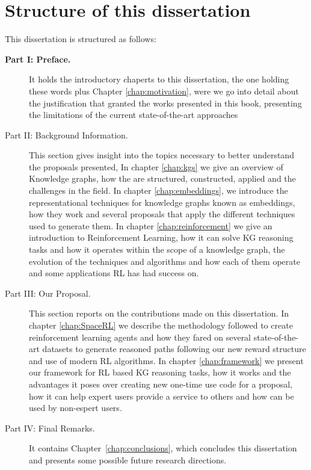 \section{Structure of this dissertation}\label{sec:intro-structure}
This dissertation is structured as follows:

\begin{description}
    \item[\textbf{Part I: Preface.}] 
    It holds the introductory chaperts to this dissertation, the one holding these words plus Chapter \ref{chap:motivation}, were we go into detail about the justification that granted the works presented in this book, presenting the limitations of the current state-of-the-art approaches\\
    
    \item[Part II: Background Information.] 
    This section gives insight into the topics necessary to better understand the proposals presented, In chapter \ref{chap:kgs} we give an overview of Knowledge graphs, how the are structured, constructed, applied and the challenges in the field. In chapter \ref{chap:embeddings}, we introduce the representational techniques for knowledge graphs known as embeddings, how they work and several proposals that apply the different techniques used to generate them. In chapter \ref{chap:reinforcement} we give an introduction to Reinforcement Learning, how it can solve KG reasoning tasks and how it operates within the scope of a knowledge graph, the evolution of the techniques and algorithms and how each of them operate and some applications RL has had success on.
    
    \item[Part III: Our Proposal.]
    This section reports on the contributions made on this dissertation. In chapter \ref{chap:SpaceRL} we describe the methodology followed to create reinforcement learning agents and how they fared on several state-of-the-art datasets to generate reasoned paths following our new reward structure and use of modern RL algorithms. In chapter \ref{chap:framework} we present our framework for RL based KG reasoning tasks, how it works and the advantages it poses over creating new one-time use code for a proposal, how it can help expert users provide a service to others and how can be used by non-espert users.
    
    \item[Part IV: Final Remarks.]
    It contains Chapter~\ref{chap:conclusions}, which concludes this dissertation and presents some possible future research directions.
\end{description}
